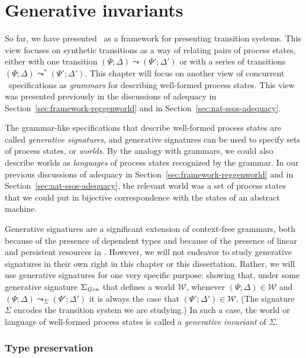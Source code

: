 \chapter{Generative invariants}
\label{chapter-gen}

So far, we have presented \sls~as a framework for presenting
transition systems. This view focuses on synthetic transitions as a
way of relating pairs of process states, either with one transition
$(\Psi; \Delta) \leadsto (\Psi'; \Delta')$ or with a series of
transitions $(\Psi; \Delta) \leadsto^* (\Psi'; \Delta')$. This chapter
will focus on another view of concurrent \sls~specifications as {\it
  grammars} for describing well-formed process states. This view was
presented previously in the discussions of adequacy in
Section~\ref{sec:framework-reggenworld} and in
Section~\ref{sec:nat-ssos-adequacy}.

The grammar-like specifications that describe well-formed process
states are called {\it generative signatures}, and generative
signatures can be used to specify sets of process states, or {\it
  worlds}. By the analogy with grammars, we could also describe worlds
as {\it languages} of process states recognized by the grammar. In our
previous discussions of adequacy in
Section~\ref{sec:framework-reggenworld} and in
Section~\ref{sec:nat-ssos-adequacy}, the relevant world was a set of
process states that we could put in bijective correspondence with the
states of an abstract machine.

Generative signatures are a significant extension of context-free 
grammars, both because of the presence of dependent types and because
of the presence of linear and persistent resources in \sls. However,
we will not endeavor to study generative signatures in their own
right in this chapter or this dissertation. Rather, we will use
generative signatures for one very specific purpose: showing that,
under some generative signature $\Sigma_{\it Gen}$ that defines a
world $\mathcal W$, whenever $(\Psi; \Delta) \in \mathcal W$ and
$(\Psi; \Delta) \leadsto_\Sigma (\Psi'; \Delta')$ it is always the
case that $(\Psi'; \Delta') \in \mathcal W$.  (The signature $\Sigma$
encodes the transition system we are studying.)  In such a case, the
world or language of well-formed process states is called a {\it
  generative invariant} of $\Sigma$.

\subsection*{Type preservation}

